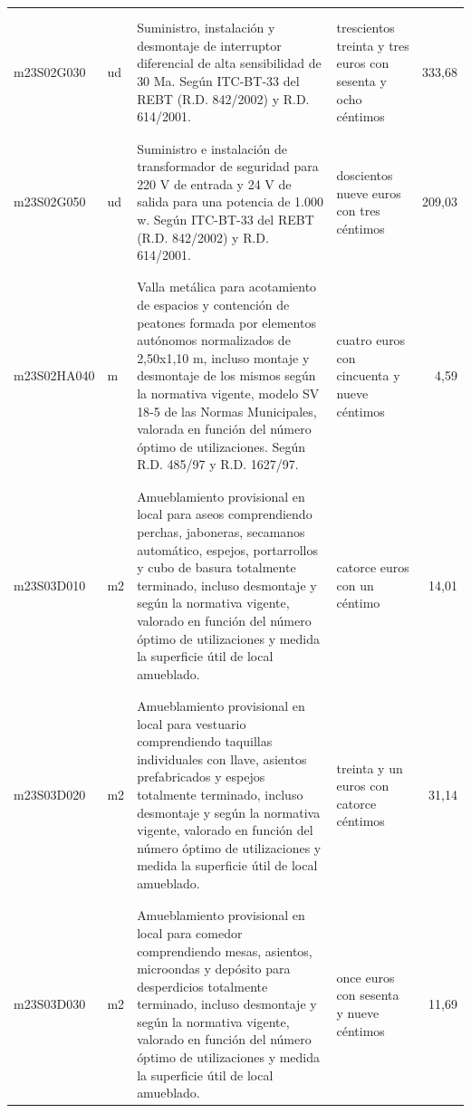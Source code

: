\documentclass{book}%
\begin{document}
\begin{longtable}{|l|l|p{5cm}|p{3cm}|r|}
&&&&\\%
&&&&\\%
m23S02G030&ud&Suministro, instalación y desmontaje de interruptor diferencial de alta sensibilidad de 30 Ma. Según ITC{-}BT{-}33 del REBT (R.D. 842/2002) y R.D. 614/2001.&trescientos treinta y tres euros con sesenta y ocho céntimos&333,68\\%
&&&&\\%
&&&&\\%
m23S02G050&ud&Suministro e instalación de transformador de seguridad para 220 V de entrada y 24 V de salida para una potencia de 1.000 w. Según ITC{-}BT{-}33 del REBT (R.D. 842/2002) y R.D. 614/2001.&doscientos nueve euros con tres céntimos&209,03\\%
&&&&\\%
&&&&\\%
m23S02HA040&m&Valla metálica para acotamiento de espacios y contención de peatones formada por elementos autónomos normalizados de 2,50x1,10 m, incluso montaje y desmontaje de los mismos según la normativa vigente, modelo SV 18{-}5 de las Normas Municipales, valorada en función del número óptimo de utilizaciones. Según R.D. 485/97 y R.D. 1627/97.&cuatro euros con cincuenta y nueve céntimos&4,59\\%
&&&&\\%
&&&&\\%
m23S03D010&m2&Amueblamiento provisional en local para aseos comprendiendo perchas, jaboneras, secamanos automático, espejos, portarrollos y cubo de basura totalmente terminado, incluso desmontaje y según la normativa vigente, valorado en función del número óptimo de utilizaciones y medida la superficie útil de local amueblado.&catorce euros con un céntimo&14,01\\%
&&&&\\%
&&&&\\%
m23S03D020&m2&Amueblamiento provisional en local para vestuario comprendiendo taquillas individuales con llave, asientos prefabricados y espejos totalmente terminado, incluso desmontaje y según la normativa vigente, valorado en función del número óptimo de utilizaciones y medida la superficie útil de local amueblado.&treinta y un euros con catorce céntimos&31,14\\%
&&&&\\%
&&&&\\%
m23S03D030&m2&Amueblamiento provisional en local para comedor comprendiendo mesas, asientos, microondas y depósito para desperdicios totalmente terminado, incluso desmontaje y según la normativa vigente, valorado en función del número óptimo de utilizaciones y medida la superficie útil de local amueblado.&once euros con sesenta y nueve céntimos&11,69\\%

\end{longtable}
\end{document}
